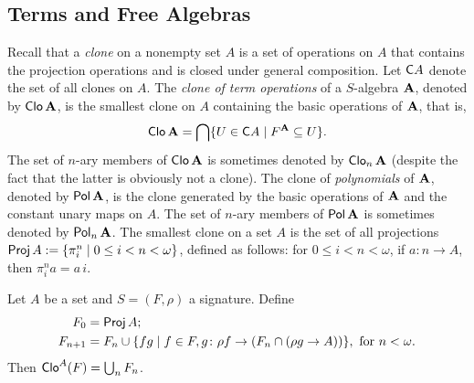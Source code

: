 \documentclass[12pt]{amsart}  %
\begin{document}

\subsection{Terms and Free Algebras}
\label{sec:free-algebras}
Recall that a \emph{clone} on a nonempty set $A$ is a set of operations on $A$
that contains the projection operations and is closed under general composition. 
Let $\mathsf{C} A$ denote the set of all clones on $A$.
The \emph{clone of term operations}
of a $S$-algebra $\mathbf{A}$, denoted by $\operatorname{\mathsf{Clo}} \mathbf{A}$,
is the smallest clone on $A$ containing the basic operations of $\mathbf{A}$, that is,
\[
\operatorname{\mathsf{Clo}} \mathbf{A} = \bigcap \{ U \in \mathsf{C} A \mid F^{\mathbf{A}} \subseteq U\}.
\]
The set of $n$-ary members of 
$\operatorname{\mathsf{Clo}} \mathbf{A}$ is sometimes denoted by $\operatorname{\mathsf{Clo}}_n \mathbf{A}$ %
(despite the fact that the latter is obviously not a clone).
The clone of \emph{polynomials} of $\mathbf{A}$, 
denoted by $\operatorname{\mathsf{Pol}} \mathbf{A}$, is the clone generated by the basic operations
of $\mathbf{A}$ and the constant unary maps on $A$. The set of $n$-ary members of 
$\operatorname{\mathsf{Pol}} \mathbf{A}$ is sometimes denoted by $\operatorname{\mathsf{Pol}}_n \mathbf{A}$.
The smallest clone on a set $A$ is the set of all projections $\operatorname{\mathsf{Proj}} A := \{\pi^n_i \mid 0\leq i < n < \omega\}$, defined as follows: for $0\leq i < n < \omega$, if  
$a \colon n \to A$, then $\pi^n_i a = a\, i$.
 
\begin{theorem} 
 Let $A$ be a set and $S = (F, \rho)$ a signature.
  Define
 \begin{align*}
  F_0 &= \operatorname{\mathsf{Proj}} A;\\
 F_{n+1} &= F_n \cup \{ f g \mid f \in F, g \colon \rho f \to (F_n \cap (\rho g \to A)) \}, \text{ for } n < \omega.
 \end{align*}
 Then $\operatorname{\mathsf{Clo}}^A(F) =  \bigcup_n F_n$.
\end{theorem}
\end{document}
